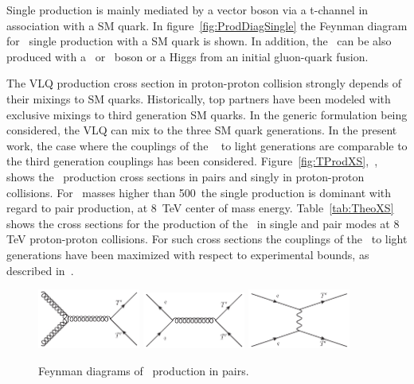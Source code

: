 Single production is mainly mediated by a vector boson via a t-channel in association with a SM quark. In figure~\ref{fig:ProdDiagSingle} the Feynman diagram for \Tp~single production with a SM quark is shown. In addition, the \Tp~can be also produced with a \Z~or \W~boson or a Higgs from an initial gluon-quark fusion. 

The VLQ production cross section in proton-proton collision strongly depends of their mixings to SM quarks. Historically, top partners have been modeled with exclusive mixings to third generation SM quarks. In the generic formulation being considered, the VLQ can mix to the three SM quark generations. In the present work, the case where the couplings of the \Tp~ to light generations are comparable to the third generation couplings has been considered. Figure~\ref{fig:TProdXS},~\cite{Cacciapaglia:2011fx}, shows the \Tp~production cross sections in pairs and singly in proton-proton collisions. For \Tp~masses higher than 500~\GeVcc the single production is dominant with regard to pair production, at 8~TeV center of mass energy. Table~\ref{tab:TheoXS} shows the cross sections for the production of the \Tp~in single and pair modes at 8 TeV proton-proton collisions. For such cross sections the couplings of the \Tp~to light generations have been maximized with respect to experimental bounds, as described in~\cite{Cacciapaglia:2011fx}.

\begin{figure}[!Hhtbp]
  \begin{center}
    \includegraphics[width=0.3\textwidth]{figs/Gluon_fusion_T_pair.jpg}
    \includegraphics[width=0.3\textwidth]{figs/Quarks_schannel_T_pair.jpg}
    \includegraphics[width=0.3\textwidth]{figs/Gluon_tchannel_T_pair.jpg}
    \caption{Feynman diagrams of \Tp~production in pairs.}
    \label{fig:ProdDiagPair}
  \end{center}
\end{figure}

